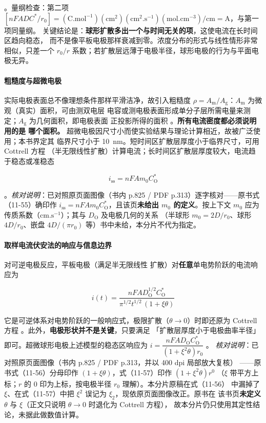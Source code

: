 。量纲检查：第二项
$[nFADC^*/r_0]=(\mathrm{C.mol^{-1}})(\mathrm{cm^2})(\mathrm{cm^2.s^{-1}})
(\mathrm{mol.cm^{-3}})/\mathrm{cm}=\mathrm{A}$，与第一项同量纲。
关键结论是：\textbf{球形扩散多出一个与时间无关的项}，这使电流在长时间区趋向稳态，
而不是像平板电极那样衰减到零。浓度分布的形式与线性情形非常相似，只差一个
$r_0/r$ 系数；若扩散层远薄于电极半径，球形电极的行为与平面电极无异。

\paragraph{粗糙度与超微电极} 实际电极表面总不像理想条件那样平滑洁净，故引入粗糙度
$\rho=A_{\mathrm{m}}/A_{\mathrm{g}}$：$A_{\mathrm{m}}$ 为微观（真实）面积，可由测双电层
电容或测电极表面形成单分子层所需电量来测定；$A_{\mathrm{g}}$ 为几何面积，即电极表面
正投影所得的面积 。\textbf{所有电流密度都必须说明用的是
哪个面积。} 超微电极因尺寸小而使实验结果与理论计算相近，故被广泛使用；本书界定其
临界尺寸小于 \qty{10}{nm}。短时间区扩散层厚度小于临界尺寸，可用 Cottrell 方程
（半无限线性扩散）计算电流；长时间区扩散层厚度较大，电流趋于稳态或准稳态

\begin{equation}
i_{\mathrm{ss}}=nFAm_0C_{\mathrm{O}}^*
\label{eq:iss-ch11}
\end{equation}

。\emph{核对说明}：已对照原页面图像（书内
p.825 / PDF p.313）逐字核对——原书式（11-55）确印作
$i_{\mathrm{ss}}=nFAm_0C_{\mathrm{O}}^*$，且该页\textbf{未给出 $m_0$ 的定义}。按上下文
$m_0$ 应为传质系数（$\mathrm{cm.s^{-1}}$）；其与 $D_{\mathrm{O}}$ 及电极几何的关系
（半球形 $m_0=2D/r_0$、球形 $4D/r_0$、嵌盘 $4D/(\pi r_0)$ 等）书中未给，本分片不代为指定。

\paragraph{取样电流伏安法的响应与信息边界} 对可逆电极反应，平板电极（满足半无限线性
扩散）对\textbf{任意}单电势阶跃的电流响应为

\begin{equation}
i(t)=\frac{nFAD_{\mathrm{O}}^{1/2}C_{\mathrm{O}}^*}
{\pi^{1/2}t^{1/2}\,(1+\xi\theta)}
\label{eq:sampled-rev}
\end{equation}

它是可逆体系对电势阶跃的一般响应式，极限扩散（$\theta\to0$）时即还原为 Cottrell 方程
。此外，\textbf{电极形状并不是关键}，只要满足
「扩散层厚度小于电极曲率半径」即可。超微球形电极上述模型的稳态区响应为
$i=\dfrac{nFAD_{\mathrm{O}}C_{\mathrm{O}}^*}{(1+\xi^{2}\theta)r_0}$
。
\emph{核对说明}：已对照原页面图像（书内 p.825 / PDF p.313，并以 400 dpi 局部放大复核）
——原书式（11-56）分母印作 $(1+\xi\theta)$，式（11-57）印作 $(1+\xi^{2}\theta)r^{0}$
（$\xi$ 带平方上标；$r$ 的 $0$ 印为上标，按电极半径 $r_0$ 理解）。本分片原稿在式（11-56）
中漏掉了 $\xi$、在式（11-57）中把 $\xi^{2}$ 误记为 $\xi_2$，现依原页面图像改正。原书在
该书页\textbf{未定义} $\theta$ 与 $\xi$（正文只说明 $\theta\to0$ 时退化为 Cottrell 方程），
故本分片仍只使用其定性结论，未据此做数值计算。

